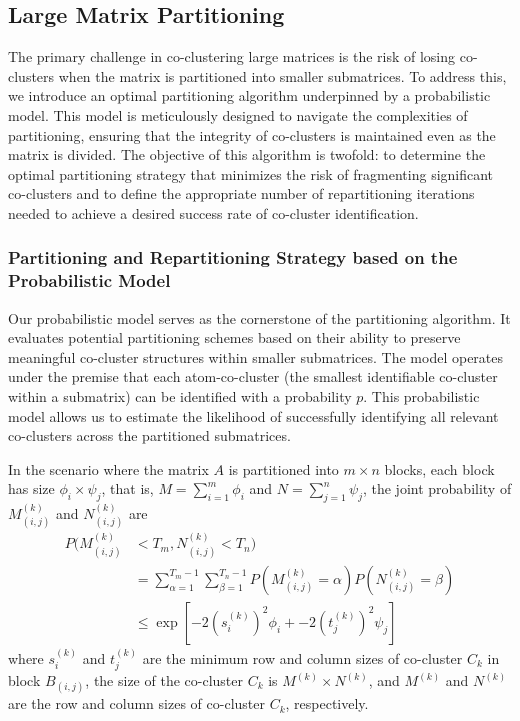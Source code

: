 \documentclass[letterpaper, 10 pt, conference]{ieeeconf}  %
\begin{document}
\subsection{Large Matrix Partitioning}
The primary challenge in co-clustering large matrices is the risk of losing co-clusters when the matrix is partitioned into smaller submatrices. To address this, we introduce an optimal partitioning algorithm underpinned by a probabilistic model. This model is meticulously designed to navigate the complexities of partitioning, ensuring that the integrity of co-clusters is maintained even as the matrix is divided. The objective of this algorithm is twofold: to determine the optimal partitioning strategy that minimizes the risk of fragmenting significant co-clusters and to define the appropriate number of repartitioning iterations needed to achieve a desired success rate of co-cluster identification.

\subsubsection{Partitioning and Repartitioning Strategy based on the Probabilistic Model}
Our probabilistic model serves as the cornerstone of the partitioning algorithm. It evaluates potential partitioning schemes based on their ability to preserve meaningful co-cluster structures within smaller submatrices. The model operates under the premise that each atom-co-cluster (the smallest identifiable co-cluster within a submatrix) can be identified with a probability $p$. This probabilistic model allows us to estimate the likelihood of successfully identifying all relevant co-clusters across the partitioned submatrices.

In the scenario where the matrix $A$ is partitioned into $m \times n$ blocks, each block has size $\phi_i \times \psi_j$, that is, $M=\sum_{i=1}^m \phi_i$ and $N=\sum_{j=1}^n \psi_j$, the joint probability of $M_{(i,j)}^{(k)}$ and $N_{(i,j)}^{(k)}$ are
\begin{equation}
    \label{eq:joint_probability}
    \begin{split}
        P(M_{(i,j)}^{(k)} & < T_m, N_{(i,j)}^{(k)} < T_n)                                                                           \\
                          & = \sum_{\alpha=1}^{T_m-1} \sum_{\beta=1}^{T_n-1} P(M_{(i,j)}^{(k)} = \alpha) P(N_{(i,j)}^{(k)} = \beta) \\
                          & \le \exp[-2 (s_i^{(k)})^2 \phi_i + -2 (t_j^{(k)})^2 \psi_j]
    \end{split}
\end{equation}
where $s_i^{(k)}$ and $t_j^{(k)}$ are the minimum row and column sizes of co-cluster $C_k$ in block $B_{(i,j)}$, the size of the co-cluster $C_k$ is $M^{(k)} \times N^{(k)}$, and $M^{(k)}$ and $N^{(k)}$ are the row and column sizes of co-cluster $C_k$, respectively.
\end{document}

